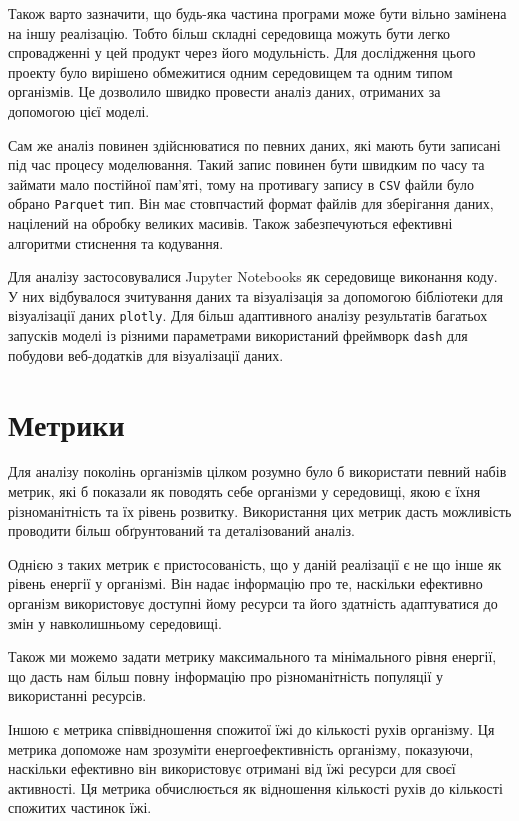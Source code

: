 Також варто зазначити, що будь-яка частина програми може 
бути вільно замінена на іншу реалізацію. 
Тобто більш складні середовища можуть бути легко спровадженні у 
цей продукт через його модульність. 
Для дослідження цього проекту було вирішено обмежитися 
одним середовищем та одним типом організмів. 
Це дозволило швидко провести аналіз даних, отриманих за допомогою цієї моделі.

Сам же аналіз повинен здійснюватися по певних даних, які мають бути записані
під час процесу моделювання.
Такий запис повинен бути швидким по часу та займати мало постійної пам'яті,
тому на противагу запису в \verb+CSV+ файли було обрано \verb+Parquet+ тип.
Він має стовпчастий формат файлів для зберігання даних, націлений на обробку
великих масивів. Також забезпечуються ефективні алгоритми стиснення та кодування.

Для аналізу застосовувалися Jupyter Notebooks як середовище виконання коду.
У них відбувалося зчитування даних та візуалізація за допомогою 
бібліотеки для візуалізації даних \verb+plotly+.
Для більш адаптивного аналізу результатів багатьох запусків моделі із
різними параметрами використаний фреймворк \verb+dash+ 
для побудови веб-додатків для візуалізації даних.



\section{Метрики}

Для аналізу поколінь організмів цілком розумно було б 
використати певний набів метрик, які б показали як 
поводять себе організми у середовищі, якою є їхня 
різноманітність та їх рівень розвитку. 
Використання цих метрик дасть можливість проводити більш 
обґрунтований та деталізований аналіз.

Однією з таких метрик є пристосованість, 
що у даній реалізації є не що інше як рівень енергії у організмі. 
Він надає інформацію про те, наскільки ефективно організм 
використовує доступні йому ресурси та його здатність 
адаптуватися до змін у навколишньому середовищі.

Також ми можемо задати метрику максимального та 
мінімального рівня енергії, що дасть нам більш повну 
інформацію про різноманітність популяції у використанні ресурсів.

Іншою є метрика співвідношення спожитої їжі до кількості 
рухів організму. 
Ця метрика допоможе нам зрозуміти енергоефективність організму, 
показуючи, наскільки ефективно він використовує отримані 
від їжі ресурси для своєї активності. 
Ця метрика обчислюється як відношення 
кількості рухів до кількості спожитих частинок їжі.

